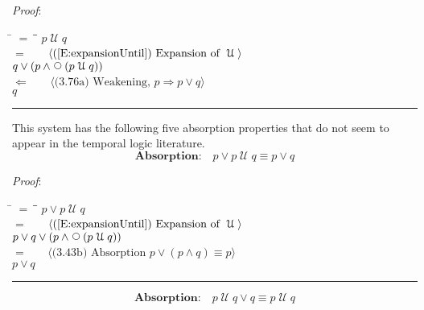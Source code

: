 \documentclass[12pt, fleqn, leqno]{article}
\newcommand{\lgap}{2pt}                             %
\newcommand{\mymathindent}{24pt}                    %
\newcommand{\impl}{\ensuremath{\Rightarrow}}        %
\newcommand{\foll}{\ensuremath{\Leftarrow}}         %
\newcommand{\Until}{\;\mathcal{U}\;}
\newcommand{\Next}{\;\,\text{\raisebox{3.5pt}{\circle{6}}}}
\newcommand{\myqed}{\rule[-.23ex]{1.2ex}{2.0ex}}
\newcommand{\myqedtab}{\hspace{384pt}}              %
\newcommand{\Gll} {\langle}                         %
\newcommand{\Ggg} {\rangle}                         %
\newcommand{\Hint}[1]     {\ \ \ $\Gll              \mbox{#1} \Ggg$ }   %
\begin{document}
\emph{Proof}:
\begin{tabbing}
\hspace{\mymathindent} \= $= \;$ \= \myqedtab \= \kill
\> \> $p \Until q$\\[\lgap]
\> $=$ \> \Hint{(\ref{E:expansionUntil}) Expansion of $\Until$} \\[\lgap]
\> \> $q \lor (p \land \Next(p \Until q))$\\[\lgap]
\> $\foll$ \> \Hint{(3.76a) Weakening, $p\impl p\lor q$} \\[\lgap]
\> \> $q$ \quad \myqed
\end{tabbing}

This system has the following five absorption properties that do not seem to
appear in the temporal logic literature.
\begin{equation}\label{E:untilOrP}
\textbf{Absorption:}\quad p \lor p \Until q \equiv p \lor q
\end{equation}

\emph{Proof}:
\begin{tabbing}
\hspace{\mymathindent} \= $= \;$ \= \myqedtab \= \kill
  \> \>   $p \lor p \Until q$\\[\lgap]
  \> $=$  \>  \Hint{(\ref{E:expansionUntil}) Expansion of $\Until$}\\[\lgap]
  \> \>   $p \lor q \lor (p \land \Next(p \Until q))$\\[\lgap]
  \> $=$  \>  \Hint{(3.43b) Absorption $p \lor (p \land q) \equiv p$}\\[\lgap]
  \> \>   $p \lor q$ \quad \myqed
\end{tabbing}
\begin{equation}\label{E:untilOrQ}
\textbf{Absorption:}\quad p \Until q \lor q \equiv p \Until q
\end{equation}
\end{document}
